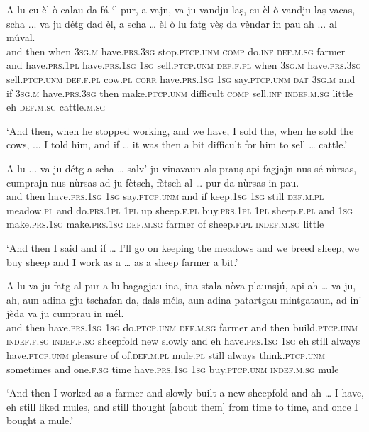 \begin{linenumbers}
\gll  A lu cu èl ò calau da fá `l pur, a vajn, va ju vandju laṣ, cu èl ò vandju laṣ vacas, scha ... va ju détg dad èl, a scha … èl ò lu fatg vèṣ da vèndar in pau ah ... al múval.\\
and then when \textsc{3sg.m} have.\textsc{prs.3sg} stop.\textsc{ptcp.unm} \textsc{comp} do.\textsc{inf} \textsc{def.m.sg} farmer and have.\textsc{prs.1pl} have.\textsc{prs.1sg} \textsc{1sg} sell.\textsc{ptcp.unm}  \textsc{def.f.pl} when \textsc{3sg.m} have.\textsc{prs.3sg} sell.\textsc{ptcp.unm} \textsc{def.f.pl} cow.\textsc{pl} \textsc{corr} {} have.\textsc{prs.1sg} \textsc{1sg} say.\textsc{ptcp.unm} \textsc{dat} \textsc{3sg.m} and if {} \textsc{3sg.m} have.\textsc{prs.3sg} then make.\textsc{ptcp.unm} difficult \textsc{comp} sell.\textsc{inf} \textsc{indef.m.sg} little eh {} \textsc{def.m.sg} cattle.\textsc{m.sg} \\
\end{linenumbers} 
\medskip
\glt `And then, when he stopped working, and we have, I sold the, when he sold the cows, ... I told him, and if … it was then a bit difficult for him to sell … cattle.'
\medskip

\begin{linenumbers}
\gll  A lu ... va ju détg a scha … salv’ ju vinavaun als prauṣ api fagjajn nus sé nùrsas, cumprajn nus nùrsas ad ju fètsch, fètsch al … pur da nùrsas in pau.\\
and then {} have.\textsc{prs.1sg} \textsc{1sg} say.\textsc{ptcp.unm} and if {} keep.\textsc{1sg} \textsc{1sg} still \textsc{def.m.pl} meadow.\textsc{pl} and do.\textsc{prs.1pl} \textsc{1pl} up sheep.\textsc{f.pl} buy.\textsc{prs.1pl} \textsc{1pl} sheep.\textsc{f.pl} and \textsc{1sg} make.\textsc{prs.1sg} make.\textsc{prs.1sg} \textsc{def.m.sg} {} farmer of sheep.\textsc{f.pl} \textsc{indef.m.sg} little\\
\end{linenumbers}
\medskip
\glt `And then I said and if …  I'll go on keeping the meadows and we breed sheep, we buy sheep and I work as a … as a sheep farmer a bit.'
\medskip

\begin{linenumbers}
\gll A lu va ju fatg al pur a lu bagagjau ina, ina stala nòva plaunsjú, api ah … va ju, ah, aun adina gju tschafan da, dals méls, aun adina patartgau mintgataun, ad in’ jèda va ju cumprau in mél. \\
and then have.\textsc{prs.1sg} \textsc{1sg} do.\textsc{ptcp.unm} \textsc{def.m.sg} farmer and then build.\textsc{ptcp.unm} \textsc{indef.f.sg} \textsc{indef.f.sg} sheepfold new slowly and eh {} have.\textsc{prs.1sg} \textsc{1sg} eh still always have.\textsc{ptcp.unm} pleasure of  of.\textsc{def.m.pl} mule.\textsc{pl} still always think.\textsc{ptcp.unm} sometimes and one.\textsc{f.sg} time have.\textsc{prs.1sg} \textsc{1sg}  buy.\textsc{ptcp.unm} \textsc{indef.m.sg} mule \\
\end{linenumbers}
\medskip
\glt `And then I worked as a farmer and slowly built a new sheepfold and ah … I have, eh still liked mules, and still thought [about them] from time to time, and once I bought a mule.'
\medskip

